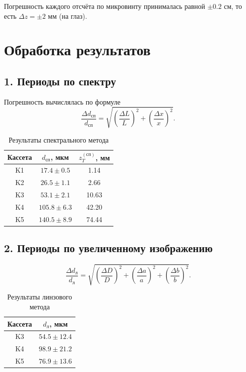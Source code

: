\documentclass[twoside]{mfitjournal}
\begin{document}
Погрешность каждого отсчёта по микровинту принималась равной $\pm 0.2$ см, то есть $\Delta z = \pm 2$ мм (на глаз).

\section*{Обработка результатов}

\subsection*{1. Периоды по спектру}

Погрешность вычислялась по формуле
\begin{equation}
\frac{\Delta d_{\text{сп}}}{d_{\text{сп}}}
=
\sqrt{
\left(\frac{\Delta L}{L}\right)^2 +
\left(\frac{\Delta x}{x}\right)^2
}.
\end{equation}

\begin{table}[H]
\centering
\caption{Результаты спектрального метода}
\begin{tabular}{ccc}
\toprule
Кассета & $d_{\text{сп}}$, мкм & $z_T^{(\text{сп})}$, мм \\
\midrule
K1 & $17.4 \pm 0.5$ & 1.14 \\
K2 & $26.5 \pm 1.1$ & 2.66 \\
K3 & $53.1 \pm 2.1$ & 10.63 \\
K4 & $105.8 \pm 6.3$ & 42.20 \\
K5 & $140.5 \pm 8.9$ & 74.44 \\
\bottomrule
\end{tabular}
\end{table}

\subsection*{2. Периоды по увеличенному изображению}

\begin{equation}
\frac{\Delta d_{\text{л}}}{d_{\text{л}}}
=
\sqrt{
\left(\frac{\Delta D}{D}\right)^2 +
\left(\frac{\Delta a}{a}\right)^2 +
\left(\frac{\Delta b}{b}\right)^2
}.
\end{equation}

\begin{table}[H]
\centering
\caption{Результаты линзового метода}
\begin{tabular}{cc}
\toprule
Кассета & $d_{\text{л}}$, мкм \\
\midrule
K3 & $54.5 \pm 12.4$ \\
K4 & $98.9 \pm 21.2$ \\
K5 & $76.9 \pm 13.6$ \\
\bottomrule
\end{tabular}
\end{table}
\end{document}

